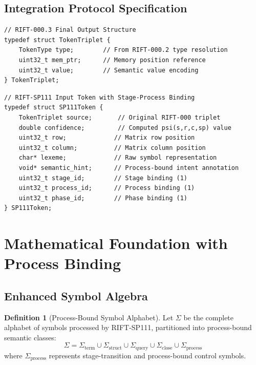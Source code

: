 \documentclass[11pt,a4paper]{article}
\theoremstyle{definition}
\newtheorem{definition}[theorem]{Definition}
\theoremstyle{remark}
\begin{document}
\subsection{Integration Protocol Specification}
\label{subsec:integration-protocol}

\begin{lstlisting}[style=riftstyle, caption={RIFT-000 TokenTriplet Output Format}, label=lst:token-triplet]
// RIFT-000.3 Final Output Structure
typedef struct TokenTriplet {
    TokenType type;        // From RIFT-000.2 type resolution
    uint32_t mem_ptr;      // Memory position reference  
    uint32_t value;        // Semantic value encoding
} TokenTriplet;
\end{lstlisting}

\begin{lstlisting}[style=riftstyle, caption={RIFT-SP111 Enhanced Token Structure}, label=lst:sp111-token]
// RIFT-SP111 Input Token with Stage-Process Binding
typedef struct SP111Token {
    TokenTriplet source;       // Original RIFT-000 triplet
    double confidence;         // Computed psi(s,r,c,sp) value
    uint32_t row;             // Matrix row position
    uint32_t column;          // Matrix column position
    char* lexeme;             // Raw symbol representation
    void* semantic_hint;      // Process-bound intent annotation
    uint32_t stage_id;        // Stage binding (1)
    uint32_t process_id;      // Process binding (1) 
    uint32_t phase_id;        // Phase binding (1)
} SP111Token;
\end{lstlisting}


\section{Mathematical Foundation with Process Binding}
\label{sec:mathematical-foundation}

\subsection{Enhanced Symbol Algebra}
\label{subsec:enhanced-symbol-algebra}

\begin{definition}[Process-Bound Symbol Alphabet]
Let $\Sigma$ be the complete alphabet of symbols processed by RIFT-SP111, partitioned into process-bound semantic classes:
\begin{equation}
\Sigma = \Sigma_{\text{term}} \cup \Sigma_{\text{struct}} \cup \Sigma_{\text{query}} \cup \Sigma_{\text{close}} \cup \Sigma_{\text{process}}
\end{equation}
where $\Sigma_{\text{process}}$ represents stage-transition and process-bound control symbols.
\end{definition}
\end{document}
